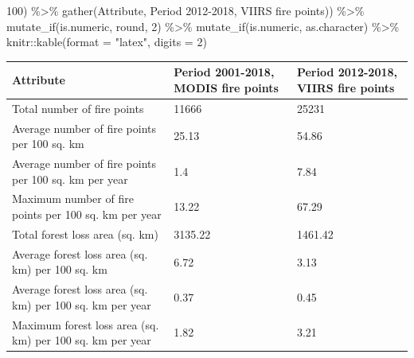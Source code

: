 \documentclass[10pt,landscape,a3paper]{article}
\newenvironment{Shaded}{\begin{snugshade}}{\end{snugshade}}
\newcommand{\AttributeTok}[1]{\textcolor[rgb]{0.77,0.63,0.00}{#1}}
\newcommand{\DecValTok}[1]{\textcolor[rgb]{0.00,0.00,0.81}{#1}}
\newcommand{\FunctionTok}[1]{\textcolor[rgb]{0.00,0.00,0.00}{#1}}
\newcommand{\NormalTok}[1]{#1}
\newcommand{\SpecialCharTok}[1]{\textcolor[rgb]{0.00,0.00,0.00}{#1}}
\newcommand{\StringTok}[1]{\textcolor[rgb]{0.31,0.60,0.02}{#1}}
\begin{document}
\begin{Shaded}
\begin{Highlighting}[]
            \DecValTok{100}\NormalTok{) }\SpecialCharTok{\%\textgreater{}\%}
        \FunctionTok{gather}\NormalTok{(Attribute, }\StringTok{\textasciigrave{}}\AttributeTok{Period 2012{-}2018, VIIRS fire points}\StringTok{\textasciigrave{}}\NormalTok{)) }\SpecialCharTok{\%\textgreater{}\%}
    \FunctionTok{mutate\_if}\NormalTok{(is.numeric, round, }\DecValTok{2}\NormalTok{) }\SpecialCharTok{\%\textgreater{}\%}
    \FunctionTok{mutate\_if}\NormalTok{(is.numeric, as.character) }\SpecialCharTok{\%\textgreater{}\%}
\NormalTok{    knitr}\SpecialCharTok{::}\FunctionTok{kable}\NormalTok{(}\AttributeTok{format =} \StringTok{"latex"}\NormalTok{, }\AttributeTok{digits =} \DecValTok{2}\NormalTok{)}
\end{Highlighting}
\end{Shaded}

\begin{tabular}{l|l|l}
\hline
Attribute & Period 2001-2018, MODIS fire points & Period 2012-2018, VIIRS fire points\\
\hline
Total number of fire points & 11666 & 25231\\
\hline
Average number of fire points per 100 sq. km & 25.13 & 54.86\\
\hline
Average number of fire points per 100 sq. km per year & 1.4 & 7.84\\
\hline
Maximum number of fire points per 100 sq. km per year & 13.22 & 67.29\\
\hline
Total forest loss area (sq. km) & 3135.22 & 1461.42\\
\hline
Average forest loss area (sq. km) per 100 sq. km & 6.72 & 3.13\\
\hline
Average forest loss area (sq. km) per 100 sq. km per year & 0.37 & 0.45\\
\hline
Maximum forest loss area (sq. km) per 100 sq. km per year & 1.82 & 3.21\\
\hline
\end{tabular}
\end{document}
